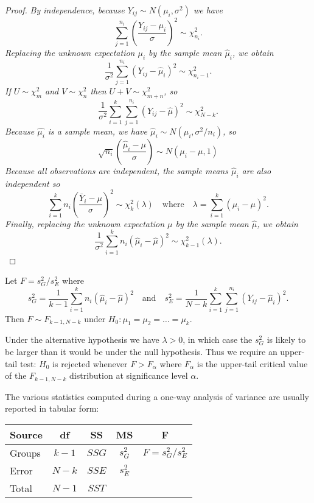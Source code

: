 \begin{proof}
\ben
\it %
By independence, because $Y_{ij}\sim N(\mu_i,\sigma^2)$ we have
\[
\sum_{j=1}^{n_i}\left(\frac{Y_{ij}-\mu_i}{\sigma}\right)^2 \sim \chi^2_{n_i}.
\]
Replacing the unknown expectation $\mu_i$ by the sample mean $\hat{\mu}_i$, we obtain
\[
\frac{1}{\sigma^2}\sum_{j=1}^{n_i}(Y_{ij}-\hat{\mu}_i)^2 \sim \chi^2_{n_i-1}.
\]
If $U\sim\chi^2_m$ and $V\sim\chi^2_n$ then $U+V\sim\chi^2_{m+n}$, so
\[
\frac{1}{\sigma^2}\sum_{i=1}^k\sum_{j=1}^{n_i}(Y_{ij}-\hat{\mu})^2 \sim \chi^2_{N-k}.
\]
\it %
Because $\hat{\mu_i}$ is a sample mean, we have $\hat{\mu}_i\sim N(\mu_i,\sigma^2/n_i)$, so
\[ 
\sqrt{n_i}\left(\frac{\hat{\mu}_i - \mu}{\sigma}\right) \sim N(\mu_i-\mu,1)
\]
Because all observations are independent, the sample means $\hat{\mu}_i$ are also independent so
\[
\sum_{i=1}^k n_i\left(\frac{\bar{Y}_i - \mu}{\sigma}\right)^2 \sim \chi^2_{k}(\lambda) 
\quad\text{where}\quad \lambda = \sum_{i=1}^k(\mu_i-\mu)^2.
\]
Finally, replacing the unknown expectation $\mu$ by the sample mean $\hat{\mu}$, we obtain 
\[
\frac{1}{\sigma^2}\sum_{i=1}^k n_i (\hat{\mu}_i - \hat{\mu})^2 \sim \chi^2_{k-1}(\lambda).
\]
\een
\end{proof}

\begin{theorem}
Let $F = s^2_G/s^2_E$ where
\[
s^2_G = \frac{1}{k-1}\sum_{i=1}^k n_i (\hat{\mu}_i-\hat{\mu})^2
\quad\text{and}\quad
s^2_E = \frac{1}{N-k}\sum_{i=1}^k\sum_{j=1}^{n_i} (Y_{ij}-\hat{\mu}_i)^2.
\]
Then $F\sim F_{k-1,N-k}$ under $H_0:\mu_1=\mu_2=\ldots=\mu_k$.
\end{theorem}

\begin{remark}
Under the alternative hypothesis we have $\lambda>0$, in which case the $s^2_G$ is likely to be larger than it would be under the null hypothesis. Thus we require an upper-tail test: $H_0$ is rejected whenever $F > F_{\alpha}$ where $F_{\alpha}$ is the upper-tail critical value of the $F_{k-1,N-k}$ distribution at significance level $\alpha$. 
\end{remark}

The various statistics computed during a one-way analysis of variance are usually reported in tabular form:
\begin{center}
\begin{tabular}{|l|c|c|c|c|} \hline
Source 	& \qquad df\qquad\mbox{}& \qquad SS\qquad\mbox{}& \qquad MS\qquad\mbox{}& \qquad F\qquad\mbox{}	\\ \hline
Groups	& $k-1$					& $SSG$					& $s^2_G$				& $F = s^2_G/s^2_E$		\\ \hline
Error 	& $N-k$					& $SSE$					& $s^2_E$				&						\\ \hline
Total	& $N-1$					& $SST$					& 						& 						\\ \hline
\end{tabular}\par
\end{center}

